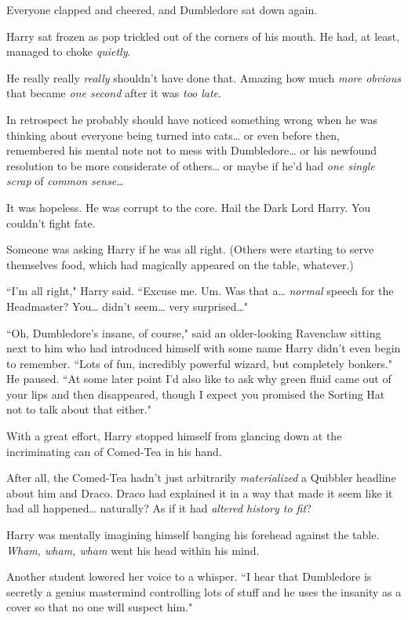 Everyone clapped and cheered, and Dumbledore sat down again.

Harry sat frozen as pop trickled out of the corners of his mouth. He had, at least, managed to choke \emph{quietly}.

He really really \emph{really} shouldn't have done that. Amazing how much \emph{more obvious} that became \emph{one second} after it was \emph{too late}.

In retrospect he probably should have noticed something wrong when he was thinking about everyone being turned into cats{\ldots} or even before then, remembered his mental note not to mess with Dumbledore{\ldots} or his newfound resolution to be more considerate of others{\ldots} or maybe if he'd had \emph{one single scrap} of \emph{common sense}{\ldots}

It was hopeless. He was corrupt to the core. Hail the Dark Lord Harry. You couldn't fight fate.

Someone was asking Harry if he was all right. (Others were starting to serve themselves food, which had magically appeared on the table, whatever.)

``I'm all right," Harry said. ``Excuse me. Um. Was that a{\ldots} \emph{normal} speech for the Headmaster? You{\ldots} didn't seem{\ldots} very surprised{\ldots}"

``Oh, Dumbledore's insane, of course," said an older-looking Ravenclaw sitting next to him who had introduced himself with some name Harry didn't even begin to remember. ``Lots of fun, incredibly powerful wizard, but completely bonkers." He paused. ``At some later point I'd also like to ask why green fluid came out of your lips and then disappeared, though I expect you promised the Sorting Hat not to talk about that either."

With a great effort, Harry stopped himself from glancing down at the incriminating can of Comed-Tea in his hand.

After all, the Comed-Tea hadn't just arbitrarily \emph{materialized} a Quibbler headline about him and Draco. Draco had explained it in a way that made it seem like it had all happened{\ldots} naturally? As if it had \emph{altered history to fit}?

Harry was mentally imagining himself banging his forehead against the table. \emph{Wham, wham, wham} went his head within his mind.

Another student lowered her voice to a whisper. ``I hear that Dumbledore is secretly a genius mastermind controlling lots of stuff and he uses the insanity as a cover so that no one will suspect him."

